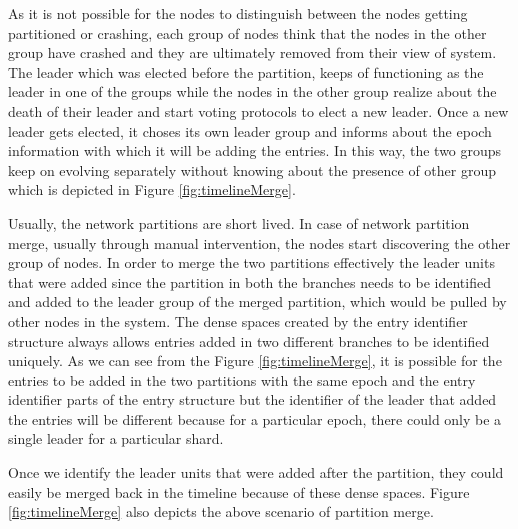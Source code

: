 \documentclass[12pt,a4paper,twoside,openright]{book}
\begin{document}
\par As it is not possible for the nodes to distinguish between the nodes getting partitioned or crashing, each group of nodes think that the nodes in the other group have crashed and they are ultimately removed from their view of system. The leader which was elected before the partition, keeps of functioning as the leader in one of the groups while the nodes in the other group realize about the death of their leader and start voting protocols to elect a new leader. Once a new leader gets elected, it choses its own leader group and informs about the epoch information with which it will be adding the entries. In this way, the two groups keep on evolving separately without knowing about the presence of other group which is depicted in Figure \ref{fig:timelineMerge}.

\par Usually, the network partitions are short lived. In case of network partition merge, usually through manual intervention, the nodes start discovering the other group of nodes. In order to merge the two partitions effectively the leader units that were added since the partition in both the branches needs to be identified and added to the leader group of the merged partition, which would be pulled by other nodes in the system. The dense spaces created by the entry identifier structure always allows entries added in two different branches to be identified uniquely. As we can see from the Figure \ref{fig:timelineMerge}, it is possible for the entries to be added in the two partitions with the same epoch and the entry identifier parts of the entry structure but the identifier of the leader that added the entries will be different because for a particular epoch, there could only be a single leader for a particular shard.

\par Once we identify the leader units that were added after the partition, they could easily be merged back in the timeline because of these dense spaces. Figure \ref{fig:timelineMerge} also depicts the above scenario of partition merge.
\end{document}
